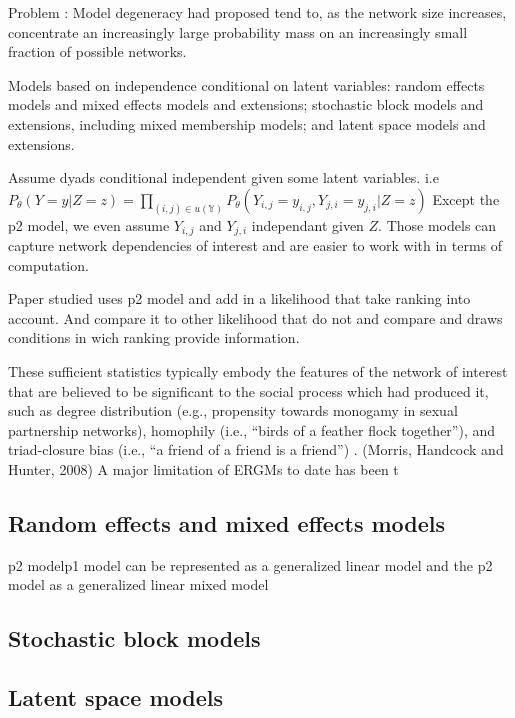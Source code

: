 \documentclass[12pt]{ociamthesis}  %
\begin{document}
	
	Problem : Model degeneracy had proposed tend to, as the network size increases, concentrate an increasingly
	large probability mass on an increasingly small fraction of possible networks.
	
	Models based on independence conditional on latent
	variables: random
	effects models and mixed effects models and extensions; stochastic block models and extensions,
	including mixed membership models; and latent space models and extensions.
	
	Assume dyads conditional independent given some latent variables. i.e
	$P_{\theta}(Y = y | Z = z) = \prod_{(i,j) \in u(\mathbb{Y})} P_{\theta}(Y_{i,j} = y_{i,j}, Y_{j,i} = y_{j,i} | Z = z)$ Except the p2 model, we even assume $Y_{i,j}$ and $Y_{j,i}$ independant given $Z$.
	Those models can capture network dependencies of interest and are easier to work with in terms of computation.
	
	Paper studied uses p2 model and add in a likelihood that take ranking into account. And compare it to other likelihood that do not and compare and draws conditions in wich ranking provide information.
	
	
	
	These sufficient statistics typically embody the
	features of the network of interest that are believed to be significant to the social
	process which had produced it, such as degree distribution (e.g., propensity
	towards monogamy in sexual partnership networks), homophily (i.e., “birds of
	a feather flock together”), and triad-closure bias (i.e., “a friend of a friend is a
	friend”) . (Morris, Handcock and Hunter, 2008)
	A major limitation of ERGMs to date has been t
	
	
	\subsection{Random effects and mixed effects models}
	p2 modelp1 model can be
	represented as a generalized linear model and the p2 model as a generalized linear mixed model
	
	
	\subsection{Stochastic block models}
	
	\subsection{Latent space models}
	
\end{document}
